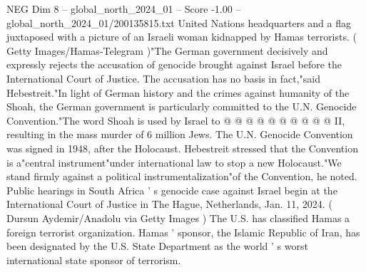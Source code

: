 \begin{textsample}{NEG Dim 8 – global\_north\_2024\_01 – Score -1.00 – global\_north\_2024\_01/200135815.txt}
United Nations headquarters and a flag juxtaposed with a picture of an Israeli woman kidnapped by Hamas terrorists. ( Getty Images/Hamas-Telegram )"The German government decisively and expressly rejects the accusation of genocide brought against Israel before the International Court of Justice.
The accusation has no basis in fact,"said Hebestreit."In light of German history and the crimes against humanity of the Shoah, the German government is particularly committed to the U.N.
Genocide Convention."The word Shoah is used by Israel to @ @ @ @ @ @ @ @ @ @ II, resulting in the mass murder of 6 million Jews.
The U.N.
Genocide Convention was signed in 1948, after the Holocaust.
Hebestreit stressed that the Convention is a"central instrument"under international law to stop a new Holocaust."We stand firmly against a political instrumentalization"of the Convention, he noted.
Public hearings in South Africa ' s genocide case against Israel begin at the International Court of Justice in The Hague, Netherlands, Jan. 11, 2024. ( Dursun Aydemir/Anadolu via Getty Images ) The U.S. has classified Hamas a foreign terrorist organization.
Hamas ' sponsor, the Islamic Republic of Iran, has been designated by the U.S.
State Department as the world ' s worst international state sponsor of terrorism.

\end{textsample}
